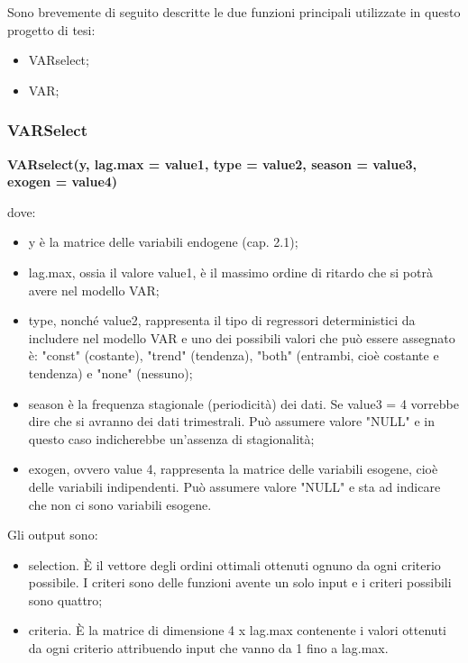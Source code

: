 \documentclass[12pt,a4paper,twoside,openright]{book}
\begin{document}
Sono brevemente di seguito descritte le due funzioni principali utilizzate in questo progetto di tesi:
\begin{itemize}
\item VARselect;
\item VAR;
\end{itemize}
\newpage
\subsubsection{VARSelect}
\begin{center}
{\bfseries 
VARselect(y, lag.max = value1, type = value2, season = value3, exogen = value4)
}
\end{center}
dove:
\begin{itemize}
\item y è la matrice delle variabili endogene (cap. 2.1);
\item lag.max, ossia il valore value1, è il massimo ordine di ritardo che si potrà avere nel modello VAR;
\item type, nonché value2, rappresenta il tipo di regressori deterministici da includere nel modello VAR e uno dei possibili valori che può essere assegnato è: "const" (costante), "trend" (tendenza), "both" (entrambi, cioè costante e tendenza) e "none" (nessuno);
\item season è la frequenza stagionale (periodicità) dei dati. Se value3 = 4 vorrebbe dire che si avranno dei dati trimestrali. Può assumere valore "NULL" e in questo caso indicherebbe un'assenza di stagionalità;
\item exogen, ovvero value 4, rappresenta la matrice delle variabili esogene, cioè delle variabili indipendenti. Può assumere valore "NULL" e sta ad indicare che non ci sono variabili esogene.
\end{itemize}

Gli output sono:
\begin{itemize}
\item selection. È il vettore degli ordini ottimali ottenuti ognuno da ogni criterio possibile. I criteri sono delle funzioni avente un solo input e i criteri possibili sono quattro;
\item criteria. È la matrice di dimensione 4 x lag.max contenente i valori ottenuti da ogni criterio attribuendo input che vanno da 1 fino a lag.max.
\end{itemize}
\end{document}
